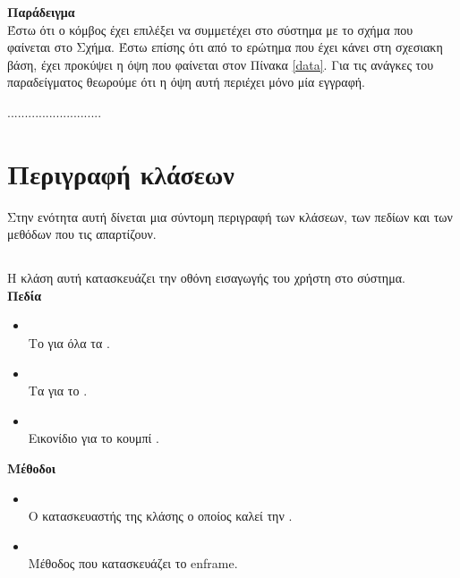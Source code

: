 \noindent\textbf{Παράδειγμα} \\

Έστω ότι ο κόμβος έχει επιλέξει να συμμετέχει στο σύστημα με το  σχήμα που φαίνεται
στο Σχήμα. Έστω επίσης ότι από το  ερώτημα που έχει κάνει στη σχεσιακη
βάση, έχει προκύψει η όψη που φαίνεται στον Πίνακα \ref{data}. Για τις ανάγκες του παραδείγματος θεωρούμε
ότι η όψη αυτή περιέχει μόνο μία εγγραφή.

...........................

\section{Περιγραφή κλάσεων}
Στην ενότητα αυτή δίνεται μια σύντομη περιγραφή των κλάσεων,
των πεδίων και των μεθόδων που τις απαρτίζουν.

\subsection{}
\noindent Η κλάση αυτή κατασκευάζει την οθόνη εισαγωγής του χρήστη στο σύστημα.\\

\noindent\textbf{Πεδία}

\begin{itemize}
\item{} \\
Το  για όλα τα .
\item{} \\
Τα  για το .
\item{} \\
Εικονίδιο για το κουμπί .
\end{itemize}

\noindent\textbf{Μέθοδοι}

\begin{itemize}
\item{}\\
Ο κατασκευαστής της κλάσης ο οποίος καλεί την .
\item{}\\
Μέθοδος που κατασκευάζει το en{frame}.
\end{itemize}


